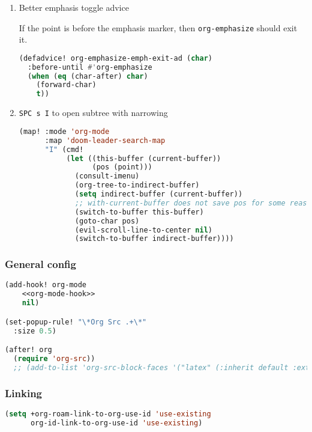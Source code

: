\documentclass[11pt]{article}
\begin{document}
\begin{enumerate}
  \item Better emphasis toggle\hfill{} advice
  \label{sec:better-emphasis-toggle}

  If the point is before the emphasis marker, then \lstinline|org-emphasize| should exit it.

\begin{lstlisting}[language=Lisp]
(defadvice! org-emphasize-emph-exit-ad (char)
  :before-until #'org-emphasize
  (when (eq (char-after) char)
    (forward-char)
    t))
\end{lstlisting}
  \item \texttt{SPC s I} to open subtree with narrowing
  \label{sec:spc-s-i-to-open-subtree-with-narrowing}

  \begin{lstlisting}[language=Lisp]
(map! :mode 'org-mode
      :map 'doom-leader-search-map
      "I" (cmd!
           (let ((this-buffer (current-buffer))
                 (pos (point)))
             (consult-imenu)
             (org-tree-to-indirect-buffer)
             (setq indirect-buffer (current-buffer))
             ;; with-current-buffer does not save pos for some reason
             (switch-to-buffer this-buffer)
             (goto-char pos)
             (evil-scroll-line-to-center nil)
             (switch-to-buffer indirect-buffer))))
\end{lstlisting}
\end{enumerate}

\subsubsection{General config}
\label{sec:general-config}
\begin{lstlisting}[language=Lisp]
(add-hook! org-mode
    <<org-mode-hook>>
    nil)

(set-popup-rule! "\*Org Src .+\*"
  :size 0.5)

(after! org
  (require 'org-src))
  ;; (add-to-list 'org-src-block-faces '("latex" (:inherit default :extend t)))
\end{lstlisting}

\subsubsection{Linking}
\label{sec:linking}
\begin{lstlisting}[language=Lisp]
(setq +org-roam-link-to-org-use-id 'use-existing
      org-id-link-to-org-use-id 'use-existing)
\end{lstlisting}
\end{document}
